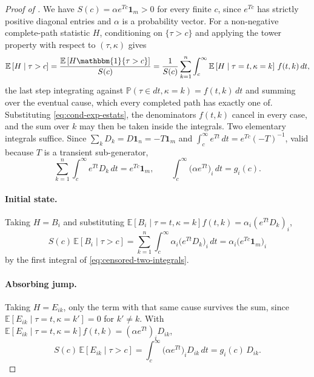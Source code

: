 \documentclass{article}
\newcommand{\Prob}{\mathbb{P}}
\newcommand{\ind}[1]{\mathbbm{1}\{#1\}}
\newcommand{\ex}[1]{\mathbb{E}\left[#1\right]}
\newcommand{\subchg}[1]{#1}
\begin{document}
\begin{proof}[Proof of ]
\subchg{We have $S(c)=\alpha e^{Tc}\mathbf{1}_m>0$ for every finite $c$, since $e^{Tc}$ has strictly positive diagonal entries and $\alpha$ is a probability vector.} For a non-negative complete-path statistic $H$, conditioning on $\{\tau>c\}$ and applying the tower property with respect to $(\tau,\kappa)$ gives
\begin{equation}
\label{eq:tail-mixture}
\ex{H\mid\tau>c}
 =\frac{\ex{H\ind{\tau>c}}}{S(c)}
 =\frac{1}{S(c)}\sum_{k=1}^n\int_c^\infty
   \ex{H\mid\tau=t,\kappa=k}\,f(t,k)\,dt ,
\end{equation}
the last step integrating against $\Prob(\tau\in dt,\kappa=k)=f(t,k)\,dt$ and summing over the eventual cause, which every completed path has exactly one of. \subchg{Substituting \eqref{eq:cond-exp-estats}, the denominators $f(t,k)$ cancel in every case, and the sum over $k$ may then be taken inside the integrals. Two elementary integrals suffice. Since $\sum_k D_k = D\mathbf 1_n = -T\mathbf 1_m$ and $\int_c^\infty e^{Tt}\,dt = e^{Tc}(-T)^{-1}$, valid because $T$ is a transient sub-generator,}
%
\begin{equation}
\label{eq:censored-two-integrals}
\subchg{\sum_{k=1}^n\int_c^\infty e^{Tt}D_k\,dt = e^{Tc}\mathbf 1_m ,
\qquad
\int_c^\infty \big(\alpha e^{Tt}\big)_i\,dt = g_i(c) .}
\end{equation}

\paragraph{Initial state.} \subchg{Taking $H=B_i$ and substituting $\ex{B_i\mid\tau=t,\kappa=k}f(t,k)=\alpha_i(e^{Tt}D_k)_i$,}
\[
S(c)\,\ex{B_{i} \mid \tau>c}
 =\sum_{k=1}^n\int_c^\infty \alpha_i\big(e^{Tt}D_k\big)_i\,dt
 =\alpha_i\big(e^{Tc}\mathbf 1_m\big)_i
\]
\subchg{by the first integral of \eqref{eq:censored-two-integrals}.}

\paragraph{Absorbing jump.} \subchg{Taking $H=E_{ik}$, only the term with that same cause survives the sum, since $\ex{E_{ik}\mid\tau=t,\kappa=k'}=0$ for $k'\neq k$. With $\ex{E_{ik}\mid\tau=t,\kappa=k}f(t,k)=(\alpha e^{Tt})_iD_{ik}$,}
\[
S(c)\,\ex{E_{ik} \mid \tau>c}
 =\int_c^\infty \big(\alpha e^{Tt}\big)_i D_{ik}\,dt
 =g_i(c)\,D_{ik} .
\]


\end{proof}
\end{document}

